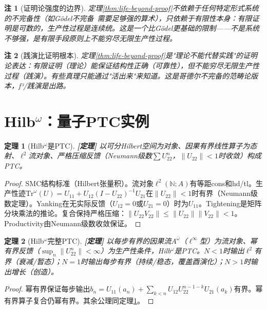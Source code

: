 \documentclass[11pt,a4paper]{article}
\newtheorem{theorem}{定理}
\newtheorem{remark}{注}
\newcommand{\lvl}[1]{\hfill\textbf{\footnotesize[#1]}}
\newcommand{\lvP}{\lvl{定理}}
\begin{document}
\begin{remark}[证明论强度的边界]
定理\ref{thm:life-beyond-proof}不依赖于任何特定形式系统的不完备性（如G\"odel不完备~\cite{godel31}需要足够强的算术），只依赖于\emph{有限性}本身：有限证明是可数的，生产性过程是连续统。这是一个比G\"odel更基础的限制——不是系统不够强，是有限手段原则上不能穷尽无限生产性过程。
\end{remark}

\begin{remark}[践演比证明根本]
定理\ref{thm:life-beyond-proof}是"理论不能代替实践"的证明论表达：有限证明（理论）能保证结构性正确（可靠性），但不能穷尽无限生产性过程（践演）。有些真理只能通过"活出来"来知道。这是哥德尔不完备的范畴论版本，f³/践演是出路。
\end{remark}

\section{Hilb$^\omega$：量子PTC实例}

\begin{theorem}[Hilb$^\omega$是PTC]\label{thm:hilb-ptc}\lvP
以可分Hilbert空间为对象、因果有界线性算子为态射、$\ell^2$流对象、严格压缩反馈（Neumann级数$\sum U_{22}^n$，$\|U_{22}\|<1$时收敛）构成PTC。
\end{theorem}

\begin{proof}
SMC结构标准（Hilbert张量积）。流对象$\ell^2(\mathbb{N};A)$有等距cons和hd/tl。生产性迹$\mathrm{Tr}^\omega(U)=U_{11}+U_{12}(I-U_{22})^{-1}U_{21}$在$\|U_{22}\|<1$时有界（Neumann级数定理）。Yanking在无实际反馈（$U_{12}=0$或$U_{21}=0$）时为$U_{11}$。Tightening是矩阵分块乘法的推论。复合保持严格压缩：$\|U_{22}V_{22}\|\leq\|U_{22}\|\|V_{22}\|<1$。Productivity由Neumann级数收敛保证。
\end{proof}

\begin{theorem}[Hilb$^\omega$完整PTC]\label{thm:hilb-ptc-full}\lvP
以每步有界的因果流$A^{\bar\omega}$（$\ell^\infty$型）为流对象、幂有界反馈（$\sup_n\|U_{22}^n\|<\infty$）为生产性条件，Hilb$^\omega$是PTC。$N<1$时输出$\ell^2$有界（衰减/暂态）；$N=1$时输出每步有界（持续/稳态，覆盖酉演化）；$N>1$时输出增长（创造）。
\end{theorem}

\begin{proof}
幂有界保证每步输出$b_n=U_{11}(a_n)+\sum_{k<n}U_{12}U_{22}^{n-1-k}U_{21}(a_k)$有界。幂有界算子复合仍幂有界。其余公理同定理\ref{thm:hilb-ptc}。
\end{proof}
\end{document}

